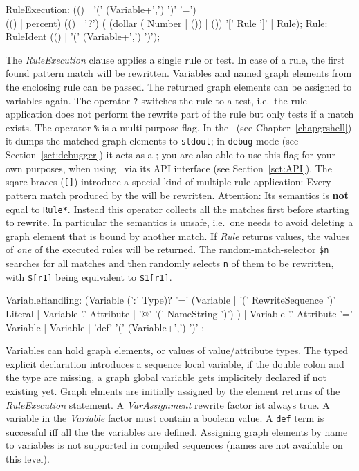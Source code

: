 \begin{rail}    
  RuleExecution: (() | '(' (Variable+',') ')' '=') \\ (() | percent) (() | '?') ( (dollar ( Number | ()) | ()) '[' Rule ']' | Rule);   
  Rule: RuleIdent (() | '(' (Variable+',') ')');
\end{rail}  
The \emph{RuleExecution} clause applies a single rule or test.
In case of a rule, the first found pattern match will be rewritten.
Variables and named graph elements from the enclosing rule can be passed.
The returned graph elements can be assigned to variables again.
The operator \texttt{?} switches the rule to a test, i.e.\ the rule application does not perform the rewrite part of the rule but only tests if a match exists.
The operator \texttt{\%} is a multi-purpose flag. 
In the \GrShell\ (see Chapter~\ref{chapgrshell}) it dumps the matched graph elements to \texttt{stdout};
in \texttt{debug}-mode (see Section~\ref{sct:debugger}) it acts as a ;
you are also able to use this flag for your own purposes, when using \GrG\ via its API interface (see Section~\ref{sct:API}).
The sqare braces (\texttt{[]}) introduce a special kind of multiple rule application:
Every pattern match produced by the will be rewritten.
Attention: Its semantics is \textbf{not} equal to \texttt{Rule*}.
Instead this operator collects all the matches first before starting to rewrite.
In particular the semantics is unsafe, i.e.\ one needs to avoid deleting a graph element that is bound by another match.
If \emph{Rule} returns values, the values of \emph{one} of the executed rules will be returned.
The random-match-selector \texttt{\$n} searches for all matches and then randomly selects \texttt{n} of them to be rewritten, with \texttt{\$[r1]} being equivalent to \texttt{\$1[r1]}.

\begin{rail}
  VariableHandling: 
    (Variable (':' Type)? '=' 
	  (Variable | 
      '(' RewriteSequence ')' | 
      Literal | 
	  Variable '.' Attribute |
	  '@' '(' NameString ')')
    ) |
	Variable '.' Attribute '=' Variable |
    Variable |
    'def' '(' (Variable+',') ')'
  ;
\end{rail}\makeatother
Variables can hold graph elements, or values of value/attribute types.
The typed explicit declaration introduces a sequence local variable, 
if the double colon and the type are missing, a graph global variable gets implicitely declared if not existing yet.
Graph elments are initially assigned by the element returns of the \emph{RuleExecution} statement.
A \emph{VarAssignment} rewrite factor ist always true.
A variable in the \emph{Variable} factor must contain a boolean value.
A \texttt{def} term is successful iff all the the variables are defined.
Assigning graph elements by name to variables is not supported in compiled sequences (names are not available on this level).


